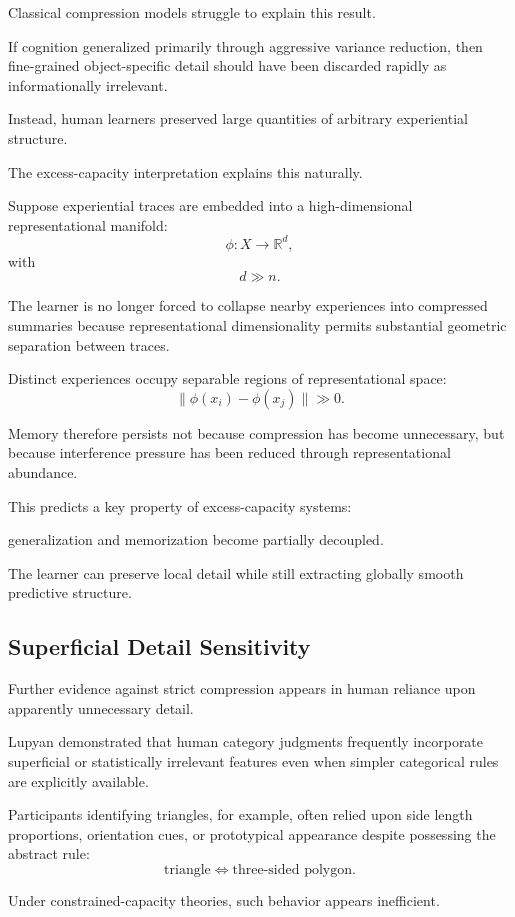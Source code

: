 \documentclass[12pt,a4paper]{article}
\begin{document}
Classical compression models struggle to explain this result.

If cognition generalized primarily through aggressive variance reduction, then fine-grained object-specific detail should have been discarded rapidly as informationally irrelevant.

Instead, human learners preserved large quantities of arbitrary experiential structure.

The excess-capacity interpretation explains this naturally.

Suppose experiential traces are embedded into a high-dimensional representational manifold:
\[
\phi:
X
\rightarrow
\mathbb{R}^d,
\]
with
\[
d \gg n.
\]

The learner is no longer forced to collapse nearby experiences into compressed summaries because representational dimensionality permits substantial geometric separation between traces.

Distinct experiences occupy separable regions of representational space:
\[
\|\phi(x_i)-\phi(x_j)\|
\gg 0.
\]

Memory therefore persists not because compression has become unnecessary, but because interference pressure has been reduced through representational abundance.

This predicts a key property of excess-capacity systems:

generalization and memorization become partially decoupled.

The learner can preserve local detail while still extracting globally smooth predictive structure.

\subsection{Superficial Detail Sensitivity}

Further evidence against strict compression appears in human reliance upon apparently unnecessary detail.

Lupyan \cite{Lupyan2009} demonstrated that human category judgments frequently incorporate superficial or statistically irrelevant features even when simpler categorical rules are explicitly available.

Participants identifying triangles, for example, often relied upon side length proportions, orientation cues, or prototypical appearance despite possessing the abstract rule:
\[
\text{triangle}
\iff
\text{three-sided polygon}.
\]

Under constrained-capacity theories, such behavior appears inefficient.
\end{document}
